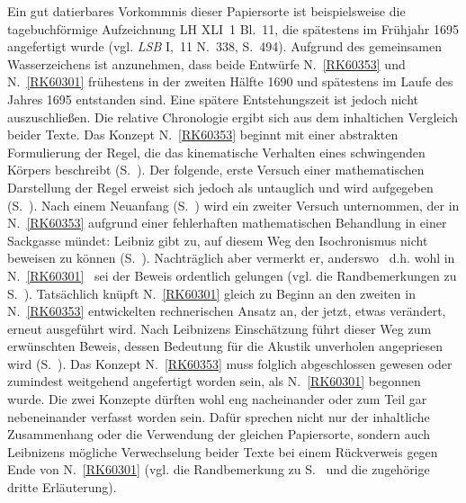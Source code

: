 Ein gut datierbares Vorkommnis dieser Papiersorte ist beispielsweise die tagebuchförmige Aufzeichnung LH XLI~1 Bl.~11, die spätestens im Frühjahr 1695 angefertigt wurde (vgl. \textit{LSB} I,~11 N.~338, S.~494).\cite{01382}
Aufgrund des gemeinsamen Wasserzeichens ist anzunehmen, dass beide Entwürfe N.~\ref{RK60353} und N.~\ref{RK60301} frühestens in der zweiten Hälfte 1690 und spätestens im Laufe des Jahres 1695 entstanden sind.
Eine spätere Entstehungszeit ist jedoch nicht auszuschließen.
\pend%
\pstart%
Die relative Chronologie ergibt sich aus dem inhaltichen Vergleich beider Texte.
Das Konzept N.~\ref{RK60353} beginnt mit einer abstrakten Formulierung der Regel, die das kinematische Verhalten eines schwingenden Körpers beschreibt (S.~).
Der folgende, erste Versuch einer mathematischen Darstellung der Regel erweist sich jedoch als untauglich und wird aufgegeben (S.~).
Nach einem Neu\-anfang (S.~) wird ein zweiter Versuch unternommen, der in N.~\ref{RK60353} aufgrund einer fehlerhaften mathematischen Behandlung in einer Sackgasse mündet:
Leibniz gibt zu, auf diesem Weg den Isochronismus nicht beweisen zu können (S.~).
Nachträglich aber vermerkt er, anderswo \textendash\ d.h. wohl in N.~\ref{RK60301} \textendash\ sei der Beweis ordentlich gelungen (vgl. die Randbemerkungen zu S.~).
Tatsächlich knüpft N.~\ref{RK60301} gleich zu Beginn an den zweiten in N.~\ref{RK60353} entwickelten rechnerischen Ansatz an, der jetzt, etwas verändert, erneut ausgeführt wird.
Nach Leibnizens Einschätzung führt dieser Weg zum erwünschten Beweis, dessen Bedeutung für die Akustik unverholen angepriesen wird (S.~).
Das Konzept N.~\ref{RK60353} muss folglich abgeschlossen gewesen oder zumindest weitgehend angefertigt worden sein, als N.~\ref{RK60301} begonnen wurde.
%
Die zwei Konzepte dürften wohl eng nacheinander oder zum Teil gar nebeneinander verfasst worden sein.
Dafür sprechen nicht nur der inhaltliche Zusammenhang oder die Verwendung der gleichen Papiersorte, sondern auch Leibnizens mögliche Verwechselung beider Texte bei einem Rückverweis gegen Ende von N.~\ref{RK60301} (vgl. die Randbemerkung zu S.~ und die zugehörige dritte Erläuterung).%
